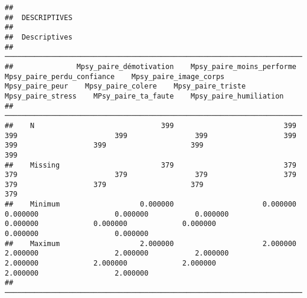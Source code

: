 \documentclass[
]{article}
\begin{document}
\begin{verbatim}
## 
##  DESCRIPTIVES
## 
##  Descriptives                                                                                                                                                                                                                                                   
##  ────────────────────────────────────────────────────────────────────────────────────────────────────────────────────────────────────────────────────────────────────────────────────────────────────────────────────────────────────────────────────────────── 
##               Mpsy_paire_démotivation    Mpsy_paire_moins_performe    Mpsy_paire_perdu_confiance    Mpsy_paire_image_corps    Mpsy_paire_peur    Mpsy_paire_colere    Mpsy_paire_triste    Mpsy_paire_stress    MPsy_paire_ta_faute    Mpsy_paire_humiliation   
##  ────────────────────────────────────────────────────────────────────────────────────────────────────────────────────────────────────────────────────────────────────────────────────────────────────────────────────────────────────────────────────────────── 
##    N                              399                          399                           399                       399                399                  399                  399                  399                    399                       399   
##    Missing                        379                          379                           379                       379                379                  379                  379                  379                    379                       379   
##    Minimum                   0.000000                     0.000000                      0.000000                  0.000000           0.000000             0.000000             0.000000             0.000000               0.000000                  0.000000   
##    Maximum                   2.000000                     2.000000                      2.000000                  2.000000           2.000000             2.000000             2.000000             2.000000               2.000000                  2.000000   
##  ──────────────────────────────────────────────────────────────────────────────────────────────────────────────────────────────────────────────────────────────────────────────────────────────────────────────────────────────────────────────────────────────
\end{verbatim}
\end{document}
